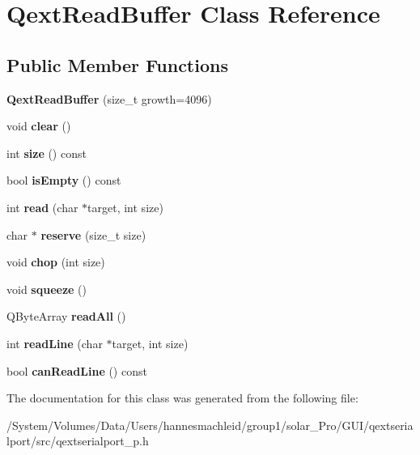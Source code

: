 \hypertarget{class_qext_read_buffer}{}\section{Qext\+Read\+Buffer Class Reference}
\label{class_qext_read_buffer}
\subsection*{Public Member Functions}
\begin{DoxyCompactItemize}
\item 
\mbox{\label{class_qext_read_buffer_ae7cc11e9623780444d5923dc1f724d88}} 
{\bfseries Qext\+Read\+Buffer} (size\+\_\+t growth=4096)
\item 
\mbox{\label{class_qext_read_buffer_ac8bb3912a3ce86b15842e79d0b421204}} 
void {\bfseries clear} ()
\item 
\mbox{\label{class_qext_read_buffer_af9593d4a5ff4274efaf429cb4f9e57cc}} 
int {\bfseries size} () const
\item 
\mbox{\label{class_qext_read_buffer_acf82f9b2937375c7b1cf3dccb3df3312}} 
bool {\bfseries is\+Empty} () const
\item 
\mbox{\label{class_qext_read_buffer_a73f6b0159524d1a7857b709ae20ac4b7}} 
int {\bfseries read} (char $\ast$target, int size)
\item 
\mbox{\label{class_qext_read_buffer_a9be34c3bd168f86b58de255faa319dfa}} 
char $\ast$ {\bfseries reserve} (size\+\_\+t size)
\item 
\mbox{\label{class_qext_read_buffer_a973d1960d194030ce4c31bccb63ce552}} 
void {\bfseries chop} (int size)
\item 
\mbox{\label{class_qext_read_buffer_a2864bb5bf45a177b41a46ab5ed60fb47}} 
void {\bfseries squeeze} ()
\item 
\mbox{\label{class_qext_read_buffer_a3b6261ecdae0766f83d351e39be9130d}} 
Q\+Byte\+Array {\bfseries read\+All} ()
\item 
\mbox{\label{class_qext_read_buffer_a9451248230fddc030adccfb310a4269e}} 
int {\bfseries read\+Line} (char $\ast$target, int size)
\item 
\mbox{\label{class_qext_read_buffer_a05b7cf4fc998401b7cf8a8851fdd7a02}} 
bool {\bfseries can\+Read\+Line} () const
\end{DoxyCompactItemize}


The documentation for this class was generated from the following file\+:\begin{DoxyCompactItemize}
\item 
/\+System/\+Volumes/\+Data/\+Users/hannesmachleid/group1/solar\+\_\+\+Pro/\+G\+U\+I/qextserialport/src/qextserialport\+\_\+p.\+h\end{DoxyCompactItemize}
